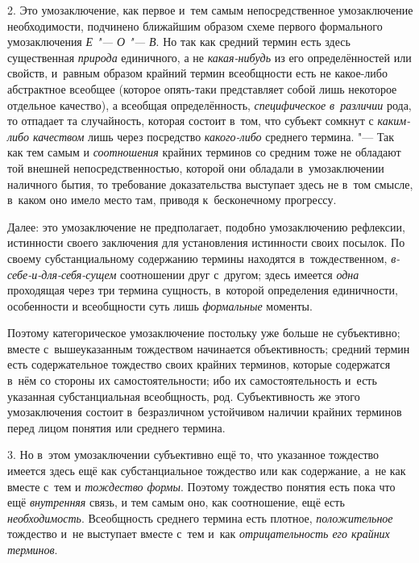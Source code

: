 2. Это умозаключение, как первое и~тем самым непосредственное
умозаключение необходимости, подчинено ближайшим образом схеме первого
формального умозаключения {\em Е "--- О "--- В}. Но так как средний
термин есть здесь существенная
{\em природа} единичного,
а не {\em какая-нибудь}
из его определённостей или свойств, и~равным образом крайний
термин всеобщности есть не какое-либо абстрактное всеобщее (которое
опять-таки представляет собой лишь некоторое отдельное качество), а
всеобщая определённость,
{\em специфическое в~различии}
рода, то отпадает та случайность, которая состоит в~том, что
субъект сомкнут с {\em каким-либо
качеством} лишь через посредство
{\em какого-либо}
среднего термина. "--- Так как тем самым и
{\em соотношения} крайних
терминов со средним тоже не обладают той внешней непосредственностью,
которой они обладали в~умозаключении наличного бытия, то требование
доказательства выступает здесь не в~том смысле, в~каком оно
имело место там, приводя к~бесконечному прогрессу.

Далее: это умозаключение не предполагает, подобно
умозаключению рефлексии, истинности своего заключения для установления
истинности своих посылок. По своему субстанциальному содержанию термины
находятся в~тождественном,
{\em в-себе-и-для-себя-сущем}
соотношении друг с~другом; здесь имеется
{\em одна} проходящая
через три термина сущность, в~которой определения единичности, особенности
и всеобщности суть лишь
{\em формальные}
моменты.

Поэтому категорическое умозаключение постольку уже больше не
субъективно; вместе с~вышеуказанным тождеством начинается объективность;
средний термин есть содержательное тождество своих крайних терминов,
которые содержатся в~нём со стороны их самостоятельности; ибо их
самостоятельность и~есть указанная субстанциальная всеобщность, род.
Субъективность же этого умозаключения состоит в~безразличном устойчивом
наличии крайних терминов перед лицом понятия или среднего термина.

3. Но в~этом умозаключении субъективно ещё то, что указанное
тождество имеется здесь ещё как субстанциальное тождество или как
содержание, а~не как вместе с~тем и
{\em тождество формы}.
Поэтому тождество понятия есть пока что ещё
{\em внутренняя} связь, и
тем самым оно, как соотношение, ещё есть
{\em необходимость}.
Всеобщность среднего термина есть плотное,
{\em положительное}
тождество и~не выступает вместе с~тем и~как
{\em отрицательность его крайних
терминов}.


